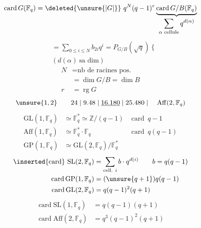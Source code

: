 \[\operatorname{card}G(\mathbb F_q)=\deleted{\unsure{\lvert G\rvert}}\ q^N(q-1)^r\underbrace{\operatorname{card}G/B(\mathbb F_q)}_{\displaystyle\sum_{\alpha\text{ cellule}}q^{d(\alpha)}}\]
\[\begin{aligned}{}&=\sum_{0\leq i\leq N}b_{2i}q^i=P_{G/B}(\sqrt q)\ \Bigg\{\\[-2pt]&(d(\alpha)\ \text{sa dim})\end{aligned}\]
\[\begin{aligned}N&=\text{nb de racines pos.}\\&=\dim G/B=\dim B\\r&=\operatorname{rg}G\end{aligned}\]
\[\unsure{1,2}\qquad 24\mid9.48\mid\underline{16.180}\mid25.480\mid\quad\mathrm{Aff}(2,\mathbb F_q)\]
\[\begin{aligned}\mathrm{GL}(1,\mathbb F_q)&\simeq\mathbb F_q^*\simeq\mathbb Z/(q-1)&\operatorname{card}\ q-1\\ \mathrm{Aff}(1,\mathbb F_q)&\simeq\mathbb F_q^*\cdot\mathbb F_q&\operatorname{card}\ q(q-1)\\ \mathrm{GP}(1,\mathbb F_q)&\simeq\mathrm{GL}(2,\mathbb F_q)/\mathbb F_q^*\end{aligned}\]
\[\begin{aligned}\inserted{\text{card}}\ \mathrm{SL}(2,\mathbb F_q)&=\sum_{\text{cell. }i}b\cdot q^{d(i)}\qquad b=q(q-1)\\ \operatorname{card}\mathrm{GP}(1,\mathbb F_q)&=(\unsure{q+1})q(q-1)\\ \operatorname{card}\mathrm{GL}(2,\mathbb F_q)&=q(q-1)^2(q+1)\end{aligned}\]
\[\begin{aligned}\operatorname{card}\mathrm{SL}(1,\mathbb F_q)&=q(q-1)(q+1)\\ \operatorname{card}\mathrm{Aff}(2,\mathbb F_q)&=q^3(q-1)^2(q+1)\end{aligned}\]
